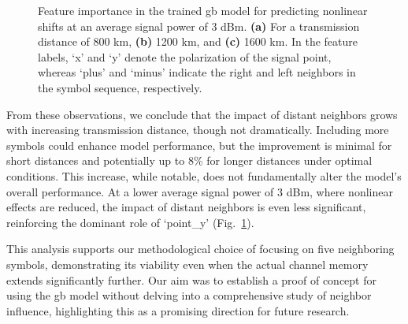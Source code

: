 \begin{figure}[tpb]
    \centering
    \begin{minipage}[h]{0.75\linewidth}
    \end{minipage}
    \caption{Feature importance in the trained \acrshort{gb} model for predicting nonlinear shifts at an average signal power of 3 dBm. \textbf{(a)} For a transmission distance of 800 km, \textbf{(b)} 1200 km, and \textbf{(c)} 1600 km. In the feature labels, `x' and `y' denote the polarization of the signal point, whereas `plus' and `minus' indicate the right and left neighbors in the symbol sequence, respectively.}
    \label{fig:importance_gb_3dbm}
\end{figure}

From these observations, we conclude that the impact of distant neighbors grows with increasing transmission distance, though not dramatically. Including more symbols could enhance model performance, but the improvement is minimal for short distances and potentially up to 8\% for longer distances under optimal conditions. This increase, while notable, does not fundamentally alter the model's overall performance. At a lower average signal power of 3 dBm, where nonlinear effects are reduced, the impact of distant neighbors is even less significant, reinforcing the dominant role of `point\_y' (Fig.~\ref{fig:importance_gb_3dbm}).

This analysis supports our methodological choice of focusing on five neighboring symbols, demonstrating its viability even when the actual channel memory extends significantly further. Our aim was to establish a proof of concept for using the \acrshort{gb} model without delving into a comprehensive study of neighbor influence, highlighting this as a promising direction for future research.

